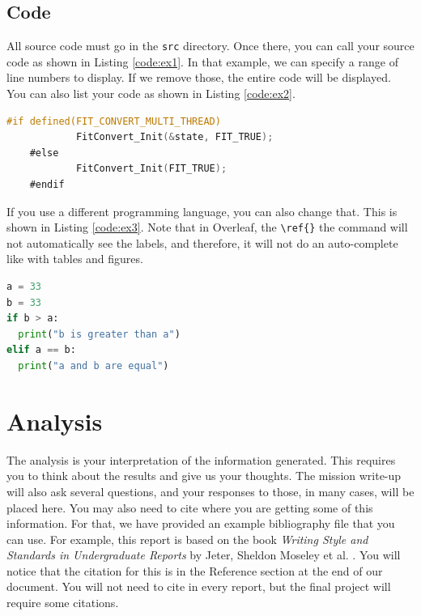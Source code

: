 \documentclass{report}
\begin{document}
\subsection{Code}
All source code must go in the \texttt{src} directory. Once there, you can call your source code as shown in Listing \ref{code:ex1}. In that example, we can specify a range of line numbers to display. If we remove those, the entire code will be displayed.
\ \\


You can also list your code as shown in Listing \ref{code:ex2}.
\begin{lstlisting}[language=C,caption={Example of listing code directly},label=code:ex2]
#if defined(FIT_CONVERT_MULTI_THREAD)
    		FitConvert_Init(&state, FIT_TRUE);
	#else
    		FitConvert_Init(FIT_TRUE);
	#endif

\end{lstlisting}
If you use a different programming language, you can also change that. This is shown in Listing \ref{code:ex3}. Note that in Overleaf, the \verb!\ref{}! the command will not automatically see the labels, and therefore, it will not do an auto-complete like with tables and figures.

\begin{lstlisting}[language=Python,caption={Python example},label=code:ex3]
a = 33
b = 33
if b > a:
  print("b is greater than a")
elif a == b:
  print("a and b are equal")

\end{lstlisting}


\section{Analysis}
The analysis is your interpretation of the information generated. This requires you to think about the results and give us your thoughts. The mission write-up will also ask several questions, and your responses to those, in many cases, will be placed here. You may also need to cite where you are getting some of this information. For that, we have provided an example bibliography file that you can use. For example, this report is based on the book \emph{Writing Style and Standards in Undergraduate Reports} by Jeter, Sheldon Moseley et al. \cite{jeter2016writing}. You will notice that the citation for this is in the Reference section at the end of our document. You will not need to cite in every report, but the final project will require some citations. 
\end{document}
